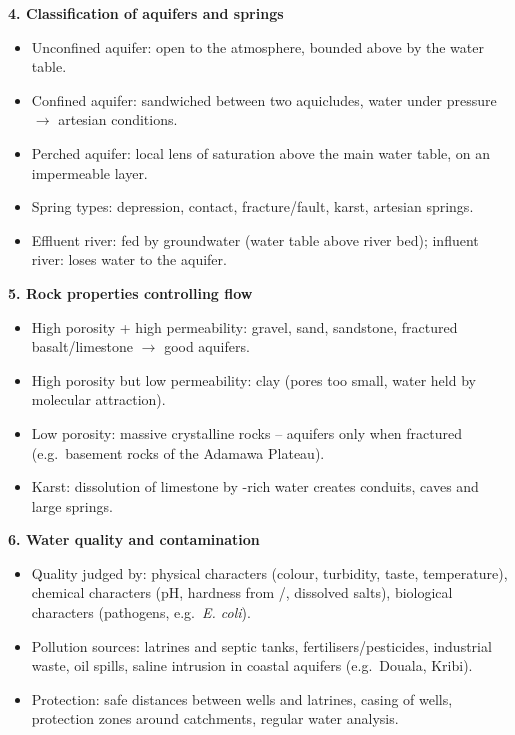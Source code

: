 \documentclass[11pt]{article}
\newcommand{\cle}[1]{{\popxbold\color{popdark}#1}}
\begin{document}
\begin{bilan}
\textbf{4. Classification of aquifers and springs}
\begin{itemize}
\item \cle{Unconfined aquifer}: open to the atmosphere, bounded above by the water table.
\item \cle{Confined aquifer}: sandwiched between two aquicludes, water under pressure $\rightarrow$ artesian conditions.
\item \cle{Perched aquifer}: local lens of saturation above the main water table, on an impermeable layer.
\item Spring types: depression, contact, fracture/fault, karst, artesian springs.
\item \cle{Effluent river}: fed by groundwater (water table above river bed); \cle{influent river}: loses water to the aquifer.
\end{itemize}

\textbf{5. Rock properties controlling flow}
\begin{itemize}
\item High porosity + high permeability: gravel, sand, sandstone, fractured basalt/limestone $\rightarrow$ good aquifers.
\item High porosity but low permeability: clay (pores too small, water held by molecular attraction).
\item Low porosity: massive crystalline rocks -- aquifers only when fractured (e.g.\ basement rocks of the Adamawa Plateau).
\item Karst: dissolution of limestone by -rich water creates conduits, caves and large springs.
\end{itemize}

\textbf{6. Water quality and contamination}
\begin{itemize}
\item Quality judged by: physical characters (colour, turbidity, taste, temperature), chemical characters (pH, hardness from /, dissolved salts), biological characters (pathogens, e.g.\ \emph{E. coli}).
\item Pollution sources: latrines and septic tanks, fertilisers/pesticides, industrial waste, oil spills, saline intrusion in coastal aquifers (e.g.\ Douala, Kribi).
\item Protection: safe distances between wells and latrines, casing of wells, protection zones around catchments, regular water analysis.
\end{itemize}


\end{bilan}
\end{document}
